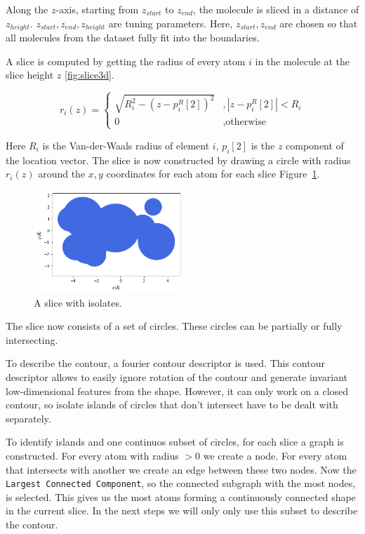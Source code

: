 Along the $z$-axis, starting from $z_{start}$ to $z_{end}$, the molecule is sliced in a distance of $z_{height}$.
$z_{start}, z_{end}, z_{height}$ are tuning parameters.
Here, $z_{start}, z_{end}$ are chosen so that all molecules from the dataset fully fit into the boundaries.

A slice is computed by getting the radius of every atom $i$ in the molecule at the slice height $z$ \ref{fig:slice3d}.

$$ r_i(z) =\left\{\begin{array}{ll} \sqrt{R_i^2 - (z - p_i^R[2])^2} &, | z - p_i^R[2] |  < R_i\\
  0 &, \text{otherwise}\end{array}\right.
$$ %

Here $R_i$ is the Van-der-Waals radius of element $i$, $p_i[2]$ is the $z$ component of the location vector.
The slice is now constructed by drawing a circle with radius $r_i(z)$ around the $x,y$ coordinates for each atom for each slice Figure~\ref{fig:slice}.

\begin{figure} [h]
  \centering
  \includegraphics[width=0.5\textwidth]{figures/fourier/slice-iso.png} %
  \caption{A slice with isolates.}
  \label{fig:slice}
\end{figure}

The slice now consists of a set of circles.
These circles can be partially or fully intersecting. 

To describe the contour, a fourier contour descriptor is used.
This contour descriptor allows to easily ignore rotation of the contour and generate invariant low-dimensional features from the shape.
However, it can only work on a closed contour, so isolate islands of circles that don't intersect have to be dealt with separately.

To identify islands and one continuos subset of circles, for each slice a graph is constructed.
For every atom with radius $>0$ we create a node.
For every atom that intersects with another we create an edge between these two nodes.
Now the \texttt{Largest Connected Component}, so the connected subgraph with the most nodes, is selected.
This gives us the most atoms forming a continuously connected shape in the current slice.
In the next steps we will only only use this subset to describe the contour.

